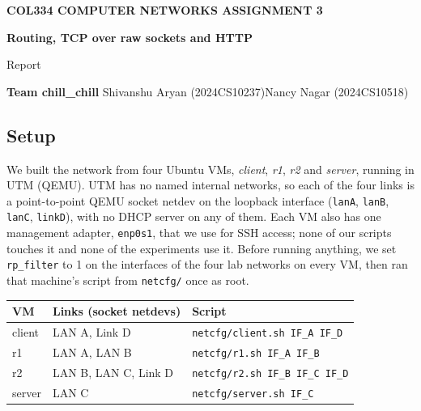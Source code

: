 \documentclass[10pt,a4paper]{article}
\newcommand{\cmd}[1]{\texttt{#1}}
\begin{document}
\begin{tcolorbox}[enhanced,colback=accent,colframe=accent,coltext=white,arc=0pt,
                  boxrule=0pt,left=14pt,right=14pt,top=12pt,bottom=12pt]
  {\small\bfseries\color{white!80}COL334 \textperiodcentered{} COMPUTER NETWORKS \textperiodcentered{} ASSIGNMENT 3}\par\vspace{4pt}
  {\LARGE\bfseries Routing, TCP over raw sockets and HTTP}\par\vspace{2pt}
  {\large Report}\par\vspace{8pt}
  {\bfseries Team chill\_chill}\quad\textperiodcentered\quad
  Shivanshu Aryan (2024CS10237)\quad\textperiodcentered\quad Nancy Nagar (2024CS10518)
\end{tcolorbox}

\vspace{4pt}
\subsection*{Setup}
We built the network from four Ubuntu VMs, \emph{client}, \emph{r1}, \emph{r2} and
\emph{server}, running in UTM (QEMU). UTM has no named internal networks, so each of the four
links is a point-to-point QEMU socket netdev on the loopback interface (\cmd{lanA}, \cmd{lanB},
\cmd{lanC}, \cmd{linkD}), with no DHCP server on any of them. Each VM also has one management
adapter, \cmd{enp0s1}, that we use for SSH access; none of our scripts touches it and none of the
experiments use it. Before running anything, we set \cmd{rp\_filter} to 1 on the interfaces of the four lab
networks on every VM, then ran that machine's script from \cmd{netcfg/} once as root.

\begin{center}\small
\begin{tabular}{@{}lll@{}}
\toprule
VM & Links (socket netdevs) & Script\\
\midrule
client & LAN A, Link D & \cmd{netcfg/client.sh IF\_A IF\_D}\\
r1     & LAN A, LAN B & \cmd{netcfg/r1.sh IF\_A IF\_B}\\
r2     & LAN B, LAN C, Link D & \cmd{netcfg/r2.sh IF\_B IF\_C IF\_D}\\
server & LAN C & \cmd{netcfg/server.sh IF\_C}\\
\bottomrule
\end{tabular}
\end{center}
\end{document}
